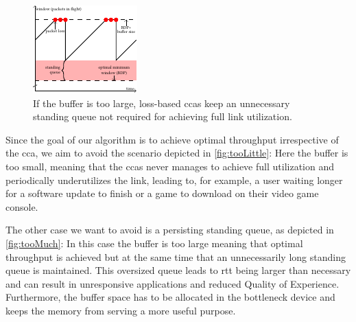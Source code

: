 \documentclass[10pt,sigconf,letterpaper,dvipsnames\ifx\removeHeaders\tempYes ,nonacm\fi]{acmart}
\begin{document}
\begin{figure}[h]
\includegraphics[width=\columnwidth]{figures/cocoa_illustration_too_much.pdf}
\caption{If the buffer is too large, loss-based \glspl{cca} keep an unnecessary standing queue not required for achieving full link utilization.}
\label{fig:tooMuch}
\end{figure}

Since the goal of our algorithm is to achieve optimal throughput irrespective of the \gls{cca}, we aim to avoid the scenario depicted in \autoref{fig:tooLittle}: Here the buffer is too small, meaning that the \glspl{cca} never manages to achieve full utilization and periodically underutilizes the link, leading to, for example, a user waiting longer for a software update to finish or a game to download on their video game console. 

The other case we want to avoid is a persisting standing queue, as depicted in \autoref{fig:tooMuch}: In this case the buffer is too large meaning that optimal throughput is achieved but at the same time that an unnecessarily long standing queue is maintained. This oversized queue leads to \gls{rtt} being larger than necessary and can result in unresponsive applications and reduced Quality of Experience. Furthermore, the buffer space has to be allocated in the bottleneck device and keeps the memory from serving a more useful purpose. 
\end{document}
